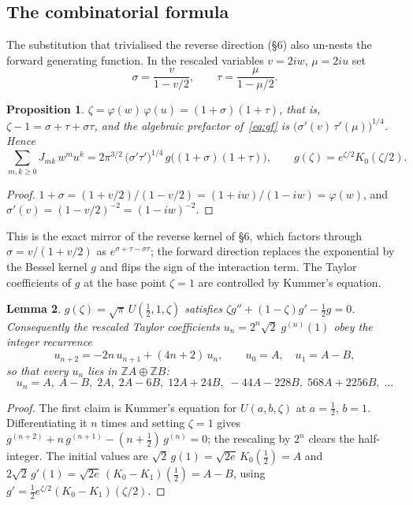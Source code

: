 \documentclass[11pt,a4paper]{article}
\newtheorem{proposition}{Proposition}[section]
\newtheorem{lemma}[proposition]{Lemma}
\newcommand{\Z}{\mathbb{Z}}
\begin{document}
\subsection*{The combinatorial formula}

The substitution that trivialised the reverse direction (\S6) also
un-nests the forward generating function. In the rescaled variables
$v = 2iw$, $\mu = 2iu$ set
\[
  \sigma = \frac{v}{1 - v/2}, \qquad \tau = \frac{\mu}{1 - \mu/2}.
\]

\begin{proposition}\label{prop:cayley}
$\zeta = \varphi(w)\,\varphi(u) = (1+\sigma)(1+\tau)$, that is,
$\zeta - 1 = \sigma + \tau + \sigma\tau$, and the algebraic prefactor
of~\eqref{eq:gf} is $\bigl(\sigma'(v)\,\tau'(\mu)\bigr)^{1/4}$.
Hence
\[
  \sum_{m,k \ge 0} J_{mk}\, w^m u^k
  = 2\pi^{3/2}\, \bigl(\sigma'\tau'\bigr)^{1/4}\,
    g\bigl((1+\sigma)(1+\tau)\bigr),
  \qquad
  g(\zeta) = e^{\zeta/2} K_0(\zeta/2).
\]
\end{proposition}

\begin{proof}
$1 + \sigma = (1+v/2)/(1-v/2) = (1+iw)/(1-iw) = \varphi(w)$, and
$\sigma'(v) = (1-v/2)^{-2} = (1-iw)^{-2}$.
\end{proof}

This is the exact mirror of the reverse kernel of \S6, which factors
through $\sigma = v/(1+v/2)$ as
$e^{\sigma+\tau-\sigma\tau}$; the forward direction replaces the
exponential by the Bessel kernel $g$ and flips the sign of the
interaction term. The Taylor coefficients of $g$ at the base point
$\zeta = 1$ are controlled by Kummer's equation.

\begin{lemma}\label{lem:kummer}
$g(\zeta) = \sqrt{\pi}\, U(\tfrac12, 1, \zeta)$ satisfies
$\zeta g'' + (1-\zeta) g' - \tfrac12 g = 0$. Consequently the
rescaled Taylor coefficients
$u_n = 2^n \sqrt{2}\; g^{(n)}(1)$ obey the integer recurrence
\[
  u_{n+2} = -2n\, u_{n+1} + (4n+2)\, u_n,
  \qquad u_0 = A, \quad u_1 = A - B,
\]
so that every $u_n$ lies in $\Z A \oplus \Z B$:
\[
  u_n = A,\; A-B,\; 2A,\; 2A - 6B,\; 12A + 24B,\; -44A - 228B,\;
  568A + 2256B,\; \ldots
\]
\end{lemma}

\begin{proof}
The first claim is Kummer's equation for $U(a,b,\zeta)$ at
$a = \tfrac12$, $b = 1$. Differentiating it $n$ times and setting
$\zeta = 1$ gives
$g^{(n+2)} + n\, g^{(n+1)} - (n + \tfrac12)\, g^{(n)} = 0$; the
rescaling by $2^n$ clears the half-integer. The initial values are
$\sqrt2\, g(1) = \sqrt{2e}\, K_0(\tfrac12) = A$ and
$2\sqrt2\, g'(1) = \sqrt{2e}\,(K_0 - K_1)(\tfrac12) = A - B$, using
$g' = \tfrac12 e^{\zeta/2}(K_0 - K_1)(\zeta/2)$.
\end{proof}
\end{document}
